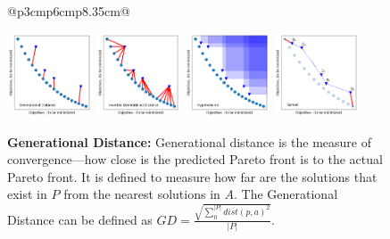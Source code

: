 \documentclass[table, xcdraw, sigconf,review, anonymous]{acmart}
\begin{document}
\begin{figure}
{\begin{tabular}{@{}p{3cm}p{6cm}p{8.35cm}@{}}
{%

\begin{minipage}[b]{0.3\linewidth}
\includegraphics[height=2.5cm]{doc/tex/msr18/img/gd.png}
\includegraphics[height=2.5cm]{doc/tex/msr18/img/igd.png}
\includegraphics[height=2.5cm]{doc/tex/msr18/img/hv.png}
\includegraphics[height=2.5cm]{doc/tex/msr18/img/spread.png}

\end{minipage}	


\begin{minipage}[b]{0.7\linewidth}
\vspace{0.1cm}
\noindent\textbf{Generational Distance: } Generational distance is the measure of convergence---how close is the predicted Pareto front is to the actual Pareto front. It is defined to measure how far are the solutions that exist in $P$ from the nearest solutions in $A$. The Generational Distance can be defined as $GD = \frac{\sqrt{\sum_{0}^{|P|} \mathit{dist}(p, a)^2}}{|P|}$.%


\end{minipage}}
\end{tabular}}
\end{figure}
\end{document}

